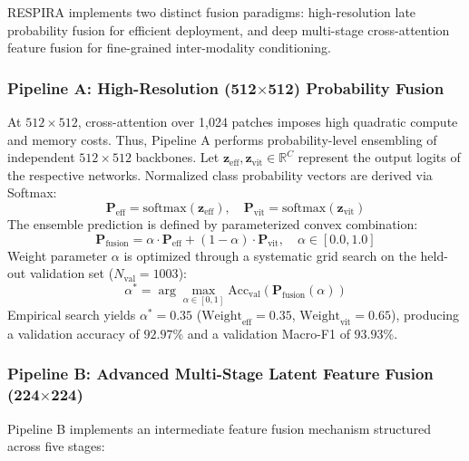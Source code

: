 \documentclass[journal]{IEEEtran}
\begin{document}
RESPIRA implements two distinct fusion paradigms: high-resolution late probability fusion for efficient deployment, and deep multi-stage cross-attention feature fusion for fine-grained inter-modality conditioning.

\subsubsection{Pipeline A: High-Resolution (512$\times$512) Probability Fusion}
At $512 \times 512$, cross-attention over 1,024 patches imposes high quadratic compute and memory costs. Thus, Pipeline A performs probability-level ensembling of independent $512 \times 512$ backbones. Let $\mathbf{z}_{\text{eff}}, \mathbf{z}_{\text{vit}} \in \mathbb{R}^{C}$ represent the output logits of the respective networks. Normalized class probability vectors are derived via Softmax:
\begin{equation}
\mathbf{P}_{\text{eff}} = \text{softmax}(\mathbf{z}_{\text{eff}}), \quad \mathbf{P}_{\text{vit}} = \text{softmax}(\mathbf{z}_{\text{vit}})
\end{equation}
The ensemble prediction is defined by parameterized convex combination:
\begin{equation}
\mathbf{P}_{\text{fusion}} = \alpha \cdot \mathbf{P}_{\text{eff}} + (1 - \alpha) \cdot \mathbf{P}_{\text{vit}}, \quad \alpha \in [0.0, 1.0]
\label{eq:prob_fusion}
\end{equation}
Weight parameter $\alpha$ is optimized through a systematic grid search on the held-out validation set ($N_{\text{val}} = 1003$):
\begin{equation}
\alpha^* = \arg\max_{\alpha \in [0, 1]} \text{Acc}_{\text{val}}(\mathbf{P}_{\text{fusion}}(\alpha))
\end{equation}
Empirical search yields $\alpha^* = 0.35$ ($\text{Weight}_{\text{eff}} = 0.35$, $\text{Weight}_{\text{vit}} = 0.65$), producing a validation accuracy of $92.97\%$ and a validation Macro-F1 of $93.93\%$.

\subsubsection{Pipeline B: Advanced Multi-Stage Latent Feature Fusion (224$\times$224)}
Pipeline B implements an intermediate feature fusion mechanism structured across five stages:
\end{document}
